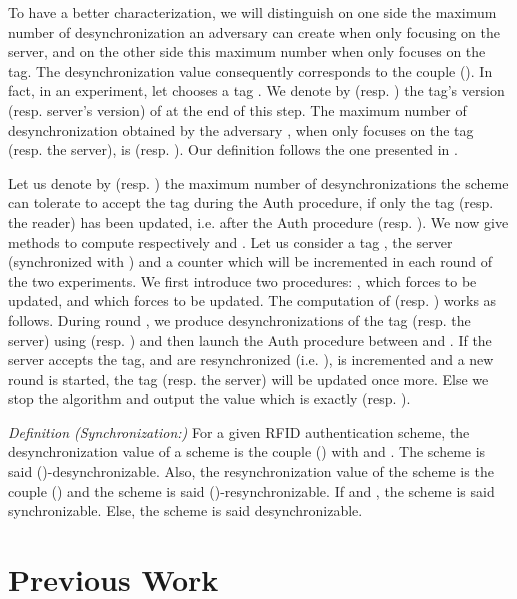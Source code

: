 \documentclass{easychair}
\begin{document}
To have a better characterization, we will distinguish on one
side the maximum number of desynchronization  an adversary can create
when only focusing on the server, and on the other side this maximum number
 when  only focuses on the tag. The desynchronization value consequently
corresponds to the couple (). In fact, in an experiment, let  chooses a tag . We
denote by  (resp. ) the tag's version (resp. server's
version) of  at the end of this step. The maximum number of desynchronization obtained by the adversary , when  only focuses on the tag (resp. the server), is  (resp. ). Our definition follows the one presented in \cite{desync:def}.

Let us denote by  (resp.  ) the maximum number of desynchronizations the
scheme can tolerate to accept the tag  during the Auth procedure, if only the tag
(resp. the reader) has been updated, i.e. after the Auth procedure (resp. ). We now give methods to compute respectively  and . Let us consider a tag  , the server  (synchronized with  ) and a counter  which will be incremented in each round of the two experiments. We first introduce two procedures:
, which forces  to be updated, and  which
forces  to be updated. The computation of  (resp.  ) works as follows. During round , we
produce  desynchronizations of the tag (resp. the server) using  (resp. ) and then launch the Auth procedure between  and  .
If the server accepts the tag,  and  are resynchronized (i.e. ),  is incremented and a new round is started, the tag (resp. the server) will be updated once more. Else we stop the algorithm
and output the value  which is exactly  (resp. ).


\textit{Definition (Synchronization:)} For a given RFID authentication scheme, the desynchronization
value of a scheme is the couple () with  and . The scheme is said ()-desynchronizable. Also, the resynchronization value of the scheme is the couple () and the scheme is said ()-resynchronizable. If  and
 , the scheme is said synchronizable. Else, the scheme is said desynchronizable.



\section{Previous Work}
\end{document}
